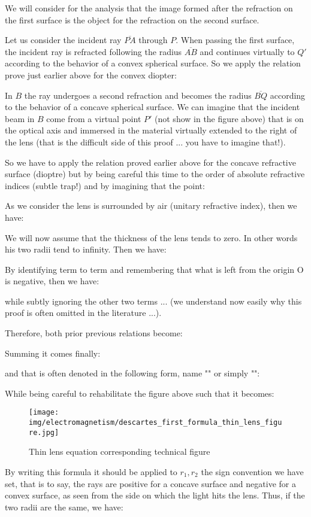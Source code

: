 	We will consider for the analysis that the image formed after the refraction on the first surface is the object for the refraction on the second surface.

	Let us consider the incident ray $\overline{PA}$ through $P$. When passing the first surface, the incident ray is refracted following the radius $\overline{AB}$ and continues virtually to $Q'$ according to the behavior of a convex spherical surface. So we apply the relation prove just earlier above for the convex diopter:	
	
	In $B$ the ray undergoes a second refraction and becomes the radius $\overline{BQ}$ according to the behavior of a concave spherical surface. We can imagine that the incident beam in $B$ come from a virtual point $P'$ (not show in the figure above) that is on the optical axis and immersed in the material virtually extended to the right of the lens (that is the difficult side of this proof ... you have to imagine that!).

	So we have to apply the relation proved earlier above for the concave refractive surface (dioptre) but by being careful this time to the order of absolute refractive indices (subtle trap!) and by imagining that the point:
	
	As we consider the lens is surrounded by air (unitary refractive index), then we have:
	
	We will now assume that the thickness of the lens tends to zero. In other words his two radii tend to infinity. Then we have:
	
	By identifying term to term and remembering that what is left from the origin O is negative, then we have:
	
	while subtly ignoring the other two terms ... (we understand now easily why this proof is often omitted in the literature ...).

	Therefore, both prior previous relations become:
	
	Summing it comes finally:
	
	and that is often denoted in the following form, name "" or simply "":
	
	While being careful to rehabilitate the figure above such that it becomes:
	\begin{figure}[H]
		\centering
		\texttt{[image: img/electromagnetism/descartes\_first\_formula\_thin\_lens\_figure.jpg]}
		\caption{Thin lens equation corresponding technical figure}
	\end{figure}
	By writing this formula it should be applied to $r_1,r_2$ the sign convention we have set, that is to say, the rays are positive for a concave surface and negative for a convex surface, as seen from the side on which the light hits the lens. Thus, if the two radii are the same, we have:
	
